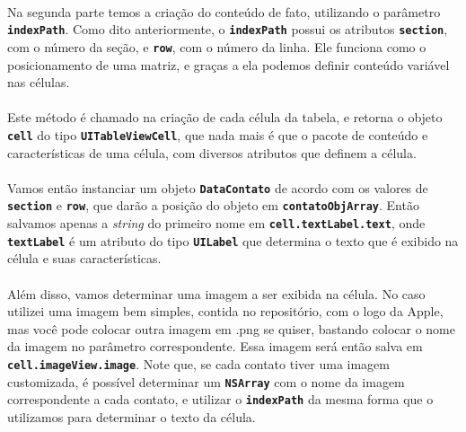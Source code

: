 \documentclass[a4paper,12pt,brazil,doubleside]{book}
\begin{document}
\begin{singlespace}
\paragraph{}Na segunda parte temos a criação do conteúdo de fato, utilizando o parâmetro \texttt{\textbf{indexPath}}. Como dito anteriormente, o \texttt{\textbf{indexPath}} possui os atributos \texttt{\textbf{section}}, com o número da seção, e \texttt{\textbf{row}}, com o número da linha. Ele funciona como o posicionamento de uma matriz, e graças a ela podemos definir conteúdo variável nas células.
\paragraph{}Este método é chamado na criação de cada célula da tabela, e retorna o objeto \texttt{\textbf{cell}} do tipo \texttt{\textbf{UITableViewCell}}, que nada mais é que o pacote de conteúdo e características de uma célula, com diversos atributos que definem a célula.
\paragraph{}Vamos então instanciar um objeto \texttt{\textbf{DataContato}} de acordo com os valores de \texttt{\textbf{section}} e \texttt{\textbf{row}}, que darão a posição do objeto em \texttt{\textbf{contatoObjArray}}. Então salvamos apenas a \emph{string} do primeiro nome em \texttt{\textbf{cell.textLabel.text}}, onde \texttt{\textbf{textLabel}} é um atributo do tipo \texttt{\textbf{UILabel}} que determina o texto que é exibido na célula e suas características.
\paragraph{}Além disso, vamos determinar uma imagem a ser exibida na célula. No caso utilizei uma imagem bem simples, contida no repositório, com o logo da Apple, mas você pode colocar outra imagem em .png se quiser, bastando colocar o nome da imagem no parâmetro correspondente. Essa imagem será então salva em \texttt{\textbf{cell.imageView.image}}. Note que, se cada contato tiver uma imagem customizada, é possível determinar um \texttt{\textbf{NSArray}} com o nome da imagem correspondente a cada contato, e utilizar o \texttt{\textbf{indexPath}} da mesma forma que o utilizamos para determinar o texto da célula.

\bigskip
\bigskip


\end{singlespace}
\end{document}
